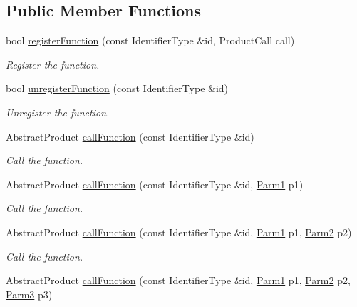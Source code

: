 \subsection*{Public Member Functions}
\begin{DoxyCompactItemize}
\item 
bool \mbox{\hyperlink{classUtil_1_1FunctionMap_a9668b22d7c1d46b48b069dfec3301aa4}{register\+Function}} (const Identifier\+Type \&id, Product\+Call call)
\begin{DoxyCompactList}\small\item\em Register the function. \end{DoxyCompactList}\item 
bool \mbox{\hyperlink{classUtil_1_1FunctionMap_a2dd347e22df5d0e63880763539289356}{unregister\+Function}} (const Identifier\+Type \&id)
\begin{DoxyCompactList}\small\item\em Unregister the function. \end{DoxyCompactList}\item 
Abstract\+Product \mbox{\hyperlink{classUtil_1_1FunctionMap_a77d04f63bd3a34e0db78b91497c037ab}{call\+Function}} (const Identifier\+Type \&id)
\begin{DoxyCompactList}\small\item\em Call the function. \end{DoxyCompactList}\item 
Abstract\+Product \mbox{\hyperlink{classUtil_1_1FunctionMap_a01b0bc21eb6d55bdefa3d2e2d64a4ed7}{call\+Function}} (const Identifier\+Type \&id, \mbox{\hyperlink{classUtil_1_1FunctionMap_a7b842c0101fae8075e8b21c90ede63cb}{Parm1}} p1)
\begin{DoxyCompactList}\small\item\em Call the function. \end{DoxyCompactList}\item 
Abstract\+Product \mbox{\hyperlink{classUtil_1_1FunctionMap_a13fa0131d38ffcbc5f3455f9061e0ef8}{call\+Function}} (const Identifier\+Type \&id, \mbox{\hyperlink{classUtil_1_1FunctionMap_a7b842c0101fae8075e8b21c90ede63cb}{Parm1}} p1, \mbox{\hyperlink{classUtil_1_1FunctionMap_a46a76423783c6a8dcc4442ffb8cf54a4}{Parm2}} p2)
\begin{DoxyCompactList}\small\item\em Call the function. \end{DoxyCompactList}\item 
Abstract\+Product \mbox{\hyperlink{classUtil_1_1FunctionMap_aacc7291774c5dfdf1304e69467ada635}{call\+Function}} (const Identifier\+Type \&id, \mbox{\hyperlink{classUtil_1_1FunctionMap_a7b842c0101fae8075e8b21c90ede63cb}{Parm1}} p1, \mbox{\hyperlink{classUtil_1_1FunctionMap_a46a76423783c6a8dcc4442ffb8cf54a4}{Parm2}} p2, \mbox{\hyperlink{classUtil_1_1FunctionMap_a4578d42cd0723beba85654aa774d0145}{Parm3}} p3)

\end{DoxyCompactItemize}
